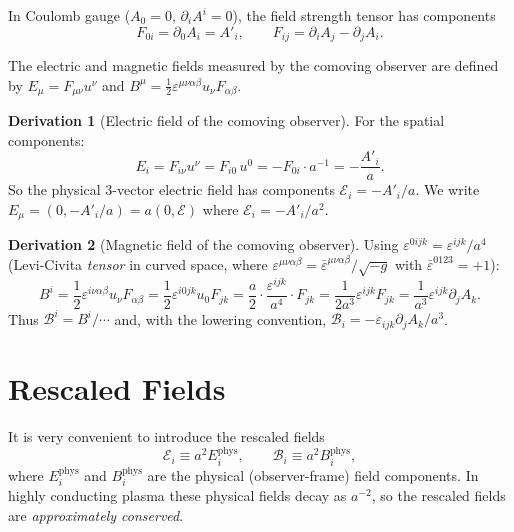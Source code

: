 \documentclass[12pt,a4paper]{report}
\renewcommand{\vec}[1]{\boldsymbol{#1}}
\theoremstyle{definition}
\newtheorem{derivation}{Derivation}[chapter]
\begin{document}
In Coulomb gauge ($A_0=0$, $\partial_i A^i = 0$), the field strength tensor has
components
\begin{equation}
  F_{0i} = \partial_0 A_i = A'_i,
  \qquad
  F_{ij} = \partial_i A_j - \partial_j A_i.
\end{equation}

The electric and magnetic fields measured by the comoving observer are defined by
$E_\mu = F_{\mu\nu}u^\nu$ and $B^\mu = \frac{1}{2}\varepsilon^{\mu\nu\alpha\beta}u_\nu F_{\alpha\beta}$.

\begin{derivation}[Electric field of the comoving observer]
For the spatial components:
\begin{equation}
  E_i = F_{i\nu}u^\nu = F_{i0}\,u^0 = -F_{0i}\cdot a^{-1} = -\frac{A'_i}{a}.
\end{equation}
So the physical 3-vector electric field has components $\mathcal{E}_i = -A'_i/a$.
We write $E_\mu = (0, -A'_i/a) = a(0, \vec{\mathcal{E}})$ where
$\mathcal{E}_i = -A'_i/a^2$.
\end{derivation}

\begin{derivation}[Magnetic field of the comoving observer]
Using $\varepsilon^{0ijk} = \varepsilon^{ijk}/a^4$ (Levi-Civita \emph{tensor} in curved
space, where $\varepsilon^{\mu\nu\alpha\beta}=\bar\varepsilon^{\mu\nu\alpha\beta}/\sqrt{-g}$
with $\bar\varepsilon^{0123}=+1$):
\begin{equation}
  B^i = \frac{1}{2}\varepsilon^{i\nu\alpha\beta}u_\nu F_{\alpha\beta}
      = \frac{1}{2}\varepsilon^{i0jk}u_0 F_{jk}
      = \frac{a}{2}\cdot\frac{\varepsilon^{ijk}}{a^4}\cdot F_{jk}
      = \frac{1}{2a^3}\varepsilon^{ijk}F_{jk}
      = \frac{1}{a^3}\varepsilon^{ijk}\partial_j A_k.
\end{equation}
Thus $\mathcal{B}^i = B^i/\cdots$ and, with the lowering convention,
$\mathcal{B}_i = -\varepsilon_{ijk}\partial_j A_k/a^3$.
\end{derivation}

\section{Rescaled Fields}

It is very convenient to introduce the rescaled fields
\begin{equation}
  \boxed{\mathcal{E}_i \equiv a^2 E_i^{\mathrm{phys}}, \qquad
  \mathcal{B}_i \equiv a^2 B_i^{\mathrm{phys}}},
  \label{eq:rescaled}
\end{equation}
where $E_i^{\mathrm{phys}}$ and $B_i^{\mathrm{phys}}$ are the physical (observer-frame)
field components. In highly conducting plasma these physical fields decay as $a^{-2}$,
so the rescaled fields are \emph{approximately conserved}.
\end{document}
